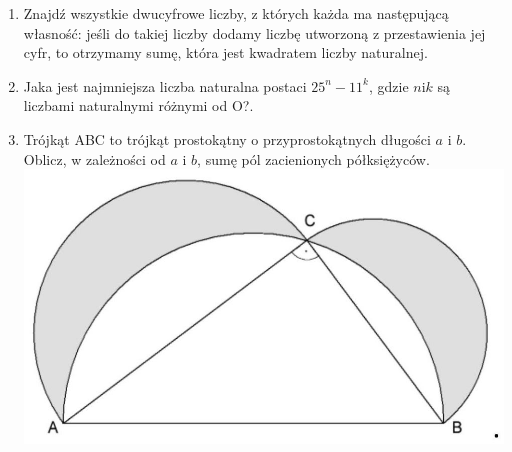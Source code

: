\documentclass[10pt]{article}
\begin{document}
\begin{enumerate}
  \item Znajdź wszystkie dwucyfrowe liczby, z których każda ma następującą własność: jeśli do takiej liczby dodamy liczbę utworzoną z przestawienia jej cyfr, to otrzymamy sumę, która jest kwadratem liczby naturalnej.
  \item Jaka jest najmniejsza liczba naturalna postaci \(25^{n}-11^{k}\), gdzie \(n \mathrm{i} k\) są liczbami naturalnymi różnymi od O?.
  \item Trójkąt ABC to trójkąt prostokątny o przyprostokątnych długości \(a\) i \(b\). Oblicz, w zależności od \(a\) i \(b\), sumę pól zacienionych półksiężyców.\\
\includegraphics[max width=\textwidth, center]{2024_11_21_ae2c3732c7ed3e53a3f1g-1}
\end{enumerate}
\end{document}
